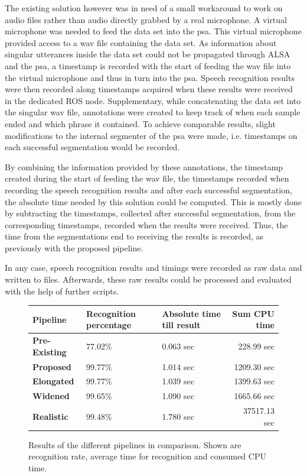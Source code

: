The existing solution however was in need of a small workaround to work on audio files rather than audio directly grabbed by a real microphone.
A virtual microphone was needed to feed the data set into the \gls{psa}.
This virtual microphone provided access to a wav file containing the data set. 
As information about singular utterances inside the data set could not be propagated through ALSA and the \gls{psa}, a timestamp is recorded with the start of feeding the wav file into the virtual microphone and thus in turn into the \gls{psa}.
Speech recognition results were then recorded along timestamps acquired when these results were received in the dedicated ROS node.
Supplementary, while concatenating the data set into the singular wav file, annotations were created to keep track of when each sample ended and which phrase it contained.
To achieve comparable results, slight modifications to the internal segmenter of the \gls{psa} were made, i.e. timestamps on each successful segmentation would be recorded.

By combining the information provided by these annotations, the timestamp created during the start of feeding the wav file, the timestamps recorded when recording the speech recognition results and after each successful segmentation, the absolute time needed by this solution could be computed. 
This is mostly done by subtracting the timestamps, collected after successful segmentation, from the corresponding timestamps, recorded when the results were received.
Thus, the time from the segmentations end to receiving the results is recorded, as previously with the proposed pipeline.

In any case, speech recognition results and timings were recorded as raw data and written to files.
Afterwards, these raw results could be processed and evaluated with the help of further scripts.

\begin{figure}[]
	\centering
	\begin{tabular}{ | l | p{} | p{} | r|}
		\hline
		\textbf{Pipeline} 	& \textbf{Recognition percentage} & \textbf{Absolute time till result} & \textbf{Sum CPU time} \\ \hline
		\textbf{Pre-Existing} 	& 77.02\% & 0.063 sec &   228.99 sec \\ \hline
		\textbf{Proposed} 	& 99.77\% & 1.014 sec &  1209.30 sec \\ \hline
		\textbf{Elongated} 	& 99.77\% & 1.039 sec &  1399.63 sec \\ \hline
		\textbf{Widened} 	& 99.65\% & 1.090 sec &  1665.66 sec \\ \hline
		\textbf{Realistic} 	& 99.48\% & 1.780 sec & 37517.13 sec \\ \hline
	\end{tabular}
	\caption{Results of the different pipelines in comparison.
		Shown are recognition rate, average time for recognition and consumed CPU time.}
	\label{table:eval_dataset_results}
\end{figure}

